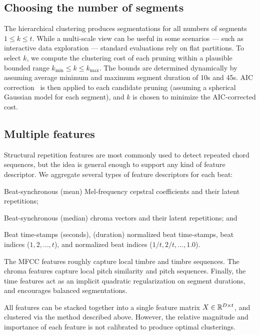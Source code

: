 \documentclass{article}
\begin{document}
\subsection{Choosing the number of segments}
The hierarchical clustering produces segmentations for all numbers of segments $1 \leq k \leq t$.  While a multi-scale view can 
be useful in some scenarios --- such as interactive data exploration --- standard evaluations rely on flat partitions. 
To select $k$, we compute the clustering cost of each pruning within a plausible bounded range 
$k_{\min} \leq k \leq k_{\max}$.  The bounds are determined dynamically by assuming average minimum and maximum segment duration 
of 10s and 45s.  AIC correction~\cite{akaike1973information} is then applied to each candidate pruning (assuming a spherical 
Gaussian model for each segment), and $k$ is chosen to minimize the AIC-corrected cost.

\subsection{Multiple features}
Structural repetition features are most commonly used to detect repeated chord sequences, but the idea is general enough to
support any kind of feature descriptor.  We aggregate several types of feature descriptors for each beat:
\begin{description}\addtolength{\itemsep}{-0.5\baselineskip}%
\item[MFCC]   Beat-synchronous (mean) Mel-frequency cepstral coefficients and their latent repetitions;
\item[Chroma] Beat-synchronous (median) chroma vectors and their latent repetitions; and
\item[Time]   Beat time-stamps (seconds), (duration) normalized beat time-stamps, beat indices ($1, 2, \ldots, t$), 
and normalized beat indices ($1/t, 2/t, \ldots, 1.0$).
\end{description}
The MFCC features roughly capture local timbre and timbre sequences. The chroma features capture local pitch similarity and pitch
sequences. Finally, the time features act as an implicit quadratic regularization on segment durations, and encourages
balanced segmentations.

All features can be stacked together into a single feature matrix $X \in \mathbb{R}^{D\times t}$, and clustered via the method described
above. However, the relative magnitude and importance of each feature is not calibrated to produce optimal clusterings. 
\end{document}
